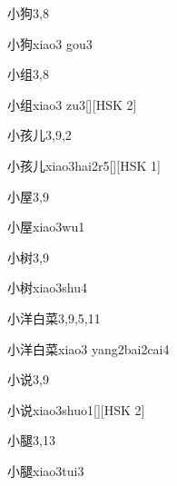 \begin{entry}{小狗}{3,8}
  \begin{phonetics}{小狗}{xiao3 gou3}
  \end{phonetics}
\end{entry}

\begin{entry}{小组}{3,8}
  \begin{phonetics}{小组}{xiao3 zu3}[][HSK 2]
  \end{phonetics}
\end{entry}

\begin{entry}{小孩儿}{3,9,2}
  \begin{phonetics}{小孩儿}{xiao3hai2r5}[][HSK 1]
  \end{phonetics}
\end{entry}

\begin{entry}{小屋}{3,9}
  \begin{phonetics}{小屋}{xiao3wu1}
  \end{phonetics}
\end{entry}

\begin{entry}{小树}{3,9}
  \begin{phonetics}{小树}{xiao3shu4}
  \end{phonetics}
\end{entry}

\begin{entry}{小洋白菜}{3,9,5,11}
  \begin{phonetics}{小洋白菜}{xiao3 yang2bai2cai4}
  \end{phonetics}
\end{entry}

\begin{entry}{小说}{3,9}
  \begin{phonetics}{小说}{xiao3shuo1}[][HSK 2]
  \end{phonetics}
\end{entry}

\begin{entry}{小腿}{3,13}
  \begin{phonetics}{小腿}{xiao3tui3}
  \end{phonetics}
\end{entry}

